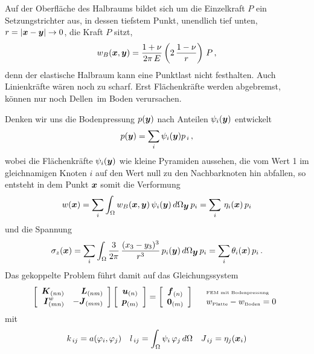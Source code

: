 Auf der Oberfl\"{a}che des Halbraums bildet sich um die Einzelkraft $P$ ein Setzungstrichter aus, in dessen tiefstem Punkt, unendlich tief unten, $r = |\vek x - \vek y| \to 0$, die Kraft $P$ sitzt,
\begin{align}\label{BSetzung}
w_B(\vek x,\vek y) = \frac{1+\nu}{2\pi\,E} \left(2\,\frac{1-\nu}{r}\right)\,P\,,
\end{align}
denn der elastische Halbraum kann eine Punktlast nicht festhalten. Auch Linienkr\"{a}fte w\"{a}ren noch zu \glq scharf\grq. Erst Fl\"{a}chenkr\"{a}fte werden abgebremst, k\"{o}nnen nur noch \glq Dellen\grq\ im Boden verursachen.

Denken wir uns die Bodenpressung $p(\vek y)$ nach Anteilen $\psi_i(\vek y)$ entwickelt
\begin{align}
p(\vek y) = \sum_i \psi_i(\vek y) p_{\,i}\,,
\end{align}
wobei die Fl\"{a}chenkr\"{a}fte $\psi_i(\vek y)$ wie kleine Pyramiden aussehen, die vom Wert 1 im gleichnamigen Knoten $i$ auf den Wert null zu den Nachbarknoten hin abfallen, so entsteht in dem Punkt $\vek x$ somit die Verformung
\begin{align}
w(\vek x) = \sum_i \int_{\Omega} w_B(\vek x,\vek y)\,\psi_i(\vek y) \,d\Omega_{\vek
y}\,p_i = \sum_i \,\eta_i(\vek x) \,p_i
\end{align}
und die Spannung
\begin{align}
\sigma_z(\vek x) = \sum_i \int_{\Omega} \frac{3}{2\pi} \,\frac{(x_3 -
y_3)^3}{r^3}\,p_i(\vek y)\,d\Omega_{\vek y}\,p_i = \sum_i \theta_i(\vek x) \,p_i\,.
\end{align}
Das gekoppelte Problem f\"{u}hrt damit auf das Gleichungssystem
\begin{align}\label{BodenSystem}
\left[ \barr {r r} \vek K_{(nn)} & \vek L_{(nm)} \\ \vek I_{(mn)}^w & -\vek J_{(mm)}
\earr \right] \left[ \barr{c} \vek u_{(n)} \\ \vek p_{(m)} \earr \right] = \left[ \barr
{c} \vek f_{(n)} \\ \vek 0_{(m)} \earr \right] \quad\barr {l} \mbox{\tiny FEM  mit
Bodenpressung}\\ w_{\mbox{\tiny Platte}} - w_{\mbox{\tiny Boden}} = 0 \earr
\end{align}
mit
\begin{align}
k_{\,ij} = a(\Np_i,\Np_j) \quad l_{\,ij}= \int_{\Omega} \psi_i\,\Np_j \,d\Omega \quad
J_{\,ij} = \eta_j(\vek x_i)
\end{align}
